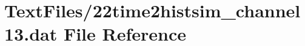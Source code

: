 \hypertarget{22time2histsim__channel13_8dat}{}\section{Text\+Files/22time2histsim\+\_\+channel13.dat File Reference}
\label{22time2histsim__channel13_8dat}
